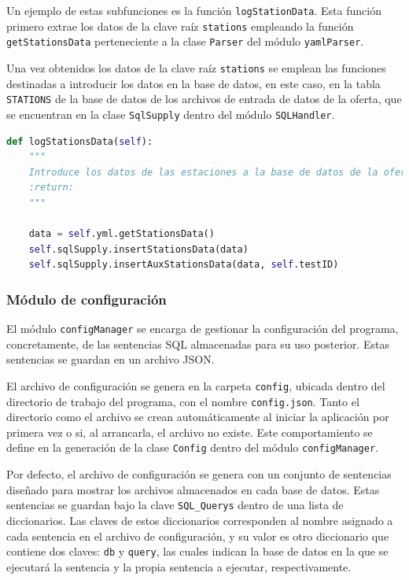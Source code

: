 Un ejemplo de estas subfunciones es la función \texttt{logStationData}. Esta función primero extrae los datos de la clave raíz \texttt{stations} empleando la función \texttt{getStationsData} perteneciente a la clase \texttt{Parser} del módulo \texttt{yamlParser}. 

Una vez obtenidos los datos de la clave raíz \texttt{stations} se emplean las funciones destinadas a introducir los datos en la base de datos, en este caso, en la tabla \texttt{STATIONS} de la base de datos de los archivos de entrada de datos de la oferta, que se encuentran en la clase \texttt{SqlSupply} dentro del módulo \texttt{SQLHandler}. 

\begin{lstlisting}[language=Python,
                   style=python,
                   frame=none,
                   numbers=none,
                   basicstyle=\ttfamily\normalsize,
                   caption={Función \texttt{logStationData}},
                   label=src:functionLogStationData,
                   inputencoding=utf8]                   
def logStationsData(self):
    """
    Introduce los datos de las estaciones a la base de datos de la oferta
    :return:
    """ 
    
    data = self.yml.getStationsData()
    self.sqlSupply.insertStationsData(data)
    self.sqlSupply.insertAuxStationsData(data, self.testID)
\end{lstlisting}

\subsubsection{Módulo de configuración}

El módulo \texttt{configManager} se encarga de gestionar la configuración del programa, concretamente, de las sentencias \acrshort{SQL} almacenadas para su uso posterior. Estas sentencias se guardan en un archivo \acrshort{JSON}. 

El archivo de configuración se genera en la carpeta \texttt{config}, ubicada dentro del directorio de trabajo del programa, con el nombre \texttt{config.json}. Tanto el directorio como el archivo se crean automáticamente al iniciar la aplicación por primera vez o si, al arrancarla, el archivo no existe. Este comportamiento se define en la generación de la clase \texttt{Config} dentro del módulo \texttt{configManager}.

Por defecto, el archivo de configuración se genera con un conjunto de sentencias diseñado para mostrar los archivos almacenados en cada base de datos. Estas sentencias se guardan bajo la clave \texttt{SQL\_Querys} dentro de una lista de diccionarios. Las claves de estos diccionarios corresponden al nombre asignado a cada sentencia en el archivo de configuración, y su valor es otro diccionario que contiene dos claves: \texttt{db} y \texttt{query}, las cuales indican la base de datos en la que se ejecutará la sentencia y la propia sentencia a ejecutar, respectivamente.

